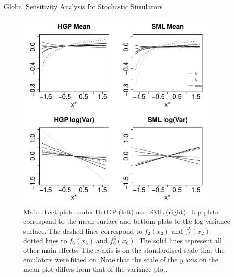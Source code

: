 \begin{chapter}{Global Sensitivity Analysis for Stochastic Simulators\label{Ch:sensitivity}}
\begin{figure}[ht]
   \centering
   \includegraphics[width=0.9\textwidth]{fig-sensitivity/main-effects-all.pdf}
     \caption{Main effect plots under HetGP (left) and SML (right). Top plots correspond to the mean surface and bottom plots to the log variance surface. The dashed lines correspond to $f_2(x_2)$ and $f_2^{\lambda}(x_2)$, dotted lines to $f_6(x_6)$ and $f_6^{\lambda}(x_6)$. The solid lines represent all other main effects. The $x$ axis is on the standardised scale that the emulators were fitted on. Note that the scale of the $y$ axis on the mean plot differs from that of the variance plot.}
  \label{Fig:main-eff-all}
\end{figure}


\end{chapter}
